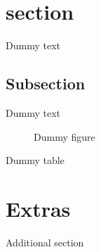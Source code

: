 \documentclass{article}
\begin{document}
\doublespacing
\tableofcontents
\singlespacing
\newpage

\section{section}

Dummy text

\subsection{Subsection}

Dummy text

\begin{figure}
	\caption{Dummy figure}
\end{figure}

\begin{table}
	\caption{Dummy table}
\end{table}

\begin{appendix}
	\listoffigures
	\listoftables
\end{appendix}

\section{Extras}

Additional section
\end{document}
